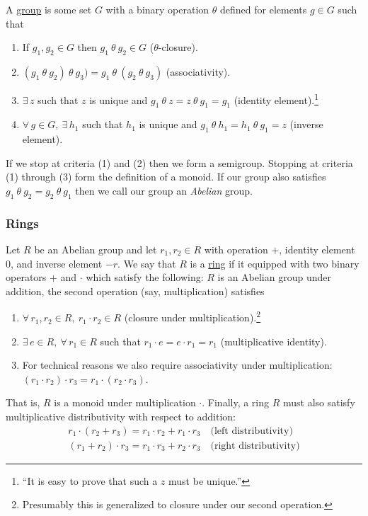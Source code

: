 \documentclass[12pt]{article}
\newlength\tindent
\renewcommand{\indent}{\hspace*{\tindent}}
\begin{document}
A \underline{group} is some set $G$ with a binary operation $\theta$ defined for elements $g \in G$ such that
\begin{enumerate}[(1)]
	\item If $g_1, g_2 \in G$ then $g_1 ~\theta~ g_2 \in G$ ($\theta$-closure).
	\item $(g_1 ~\theta~ g_2) ~\theta~ g_3) = g_1 ~\theta~ (g_2 ~\theta~ g_3)$ (associativity).
	\item $\exists\, z$ such that $z$ is unique and $g_1 ~\theta~ z = z ~\theta~ g_1 = g_1$ (identity element).\footnote{``It is easy to prove that such a $z$ must be unique.''} 
	\item $\forall\, g \in G,~\exists\,h_1$ such that $h_1$ is unique and $g_1 ~\theta~ h_1 = h_1 ~\theta~ g_1 = z$ (inverse element).
\end{enumerate}

\indent If we stop at criteria (1) and (2) then we form a semigroup. Stopping at criteria (1) through (3) form the definition of a monoid. If our group also satisfies $g_1 ~\theta~ g_2 = g_2 ~\theta~ g_1$ then we call our group an {\em Abelian} group. \\

\subsubsection{Rings}

\indent Let $R$ be an Abelian group and let $r_1, r_2 \in R$ with operation $+$, identity element $0$, and inverse element $-r$. We say that $R$ is a \underline{ring} if it equipped with two binary operators $+$ and $\cdot$ which satisfy the following: $R$ is an Abelian group under addition, the second operation (say, multiplication) satisfies
\begin{enumerate}[(1)]
	\item $\forall\,r_1, r_2 \in R, ~r_1 \cdot r_2 \in R$ (closure under multiplication).\footnote{Presumably this is generalized to closure under our second operation.}
	\item $\exists\,e \in R,~\forall\,r_1 \in R$ such that $r_1 \cdot e = e \cdot r_1 = r_1$ (multiplicative identity).
	\item For technical reasons we also require associativity under multiplication: $(r_1 \cdot r_2) \cdot r_3 = r_1 \cdot (r_2 \cdot r_3)$.
\end{enumerate}

\indent That is, $R$ is a monoid under multiplication $\cdot$. Finally, a ring $R$ must also satisfy multiplicative distributivity with respect to addition:
\begin{align*}
	r_1 \cdot (r_2 + r_3) = r_1 \cdot r_2 + r_1 \cdot r_3 \quad \text{(left distributivity)} \\
	(r_1 + r_2) \cdot r_3 = r_1 \cdot r_3 + r_2 \cdot r_3 \quad \text{(right distributivity)}
\end{align*}
\end{document}
